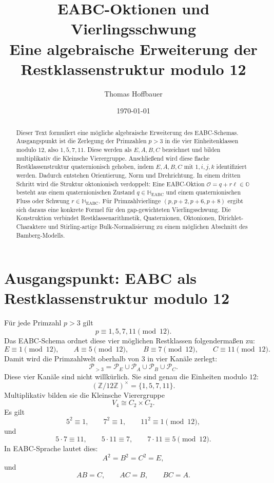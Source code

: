 \documentclass[11pt,a4paper]{article}
\title{EABC-Oktionen und Vierlingsschwung\\
	\large Eine algebraische Erweiterung der Restklassenstruktur modulo 12}
\author{Thomas Hoffbauer}
\date{\today}
\theoremstyle{definition}
\theoremstyle{plain}
\newcommand{\Z}{\mathbb{Z}}
\newcommand{\HH}{\mathbb{H}}
\newcommand{\OO}{\mathbb{O}}
\newcommand{\PP}{\mathcal{P}}
\newcommand{\EABC}{\mathrm{EABC}}
\begin{document}
	
	\maketitle
	
	\begin{abstract}
		Dieser Text formuliert eine mögliche algebraische Erweiterung des EABC-Schemas. Ausgangspunkt ist die Zerlegung der Primzahlen $p>3$ in die vier Einheitenklassen modulo $12$, also $1,5,7,11$. Diese werden als $E,A,B,C$ bezeichnet und bilden multiplikativ die Kleinsche Vierergruppe. Anschließend wird diese flache Restklassenstruktur quaternionisch gehoben, indem $E,A,B,C$ mit $1,i,j,k$ identifiziert werden. Dadurch entstehen Orientierung, Norm und Drehrichtung. In einem dritten Schritt wird die Struktur oktonionisch verdoppelt: Eine EABC-Oktion $\mathcal O=q+r\ell\in\OO$ besteht aus einem quaternionischen Zustand $q\in\HH_{\EABC}$ und einem quaternionischen Fluss oder Schwung $r\in\HH_{\EABC}$. Für Primzahlvierlinge $(p,p+2,p+6,p+8)$ ergibt sich daraus eine konkrete Formel für den gap-gewichteten Vierlingsschwung. Die Konstruktion verbindet Restklassenarithmetik, Quaternionen, Oktonionen, Dirichlet-Charaktere und Stirling-artige Bulk-Normalisierung zu einem möglichen Abschnitt des Bamberg-Modells.
	\end{abstract}
	
	\tableofcontents
	
	\section{Ausgangspunkt: EABC als Restklassenstruktur modulo 12}
	
	Für jede Primzahl $p>3$ gilt
	\[
	p \equiv 1,5,7,11 \pmod{12}.
	\]
	Das EABC-Schema ordnet diese vier möglichen Restklassen folgendermaßen zu:
	\[
	E \equiv 1 \pmod{12}, \qquad
	A \equiv 5 \pmod{12}, \qquad
	B \equiv 7 \pmod{12}, \qquad
	C \equiv 11 \pmod{12}.
	\]
	Damit wird die Primzahlwelt oberhalb von $3$ in vier Kanäle zerlegt:
	\[
	\PP_{>3}
	=
	\PP_E \cup \PP_A \cup \PP_B \cup \PP_C.
	\]
	Diese vier Kanäle sind nicht willkürlich. Sie sind genau die Einheiten modulo $12$:
	\[
	(\Z/12\Z)^\times = \{1,5,7,11\}.
	\]
	Multiplikativ bilden sie die Kleinsche Vierergruppe
	\[
	V_4 \cong C_2\times C_2.
	\]
	Es gilt
	\[
	5^2\equiv 1,\qquad 7^2\equiv 1,\qquad 11^2\equiv 1 \pmod{12},
	\]
	und
	\[
	5\cdot 7\equiv 11,\qquad
	5\cdot 11\equiv 7,\qquad
	7\cdot 11\equiv 5 \pmod{12}.
	\]
	In EABC-Sprache lautet dies:
	\[
	A^2=B^2=C^2=E,
	\]
	und
	\[
	AB=C,\qquad AC=B,\qquad BC=A.
	\]
	
\end{document}
